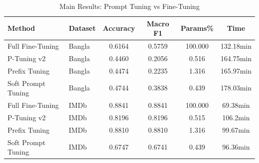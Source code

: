 \begin{table}[htbp]
\centering
\caption{Main Results: Prompt Tuning vs Fine-Tuning}
\label{tab:main}
\begin{tabular}{llcccc}
\toprule
Method & Dataset & Accuracy & Macro F1 & Params\% & Time \\
\midrule
Full Fine-Tuning & Bangla & 0.6164 & 0.5759 & 100.000 & 132.18min \\
P-Tuning v2 & Bangla & 0.4460 & 0.2056 & 0.516 & 164.75min \\
Prefix Tuning & Bangla & 0.4474 & 0.2235 & 1.316 & 165.97min \\
Soft Prompt Tuning & Bangla & 0.4744 & 0.3838 & 0.439 & 178.03min \\
\midrule
Full Fine-Tuning & IMDb & 0.8841 & 0.8841 & 100.000 & 69.38min \\
P-Tuning v2 & IMDb & 0.8196 & 0.8196 & 0.515 & 106.2min \\
Prefix Tuning & IMDb & 0.8810 & 0.8810 & 1.316 & 99.67min \\
Soft Prompt Tuning & IMDb & 0.6747 & 0.6741 & 0.439 & 96.36min \\
\bottomrule
\end{tabular}
\end{table}